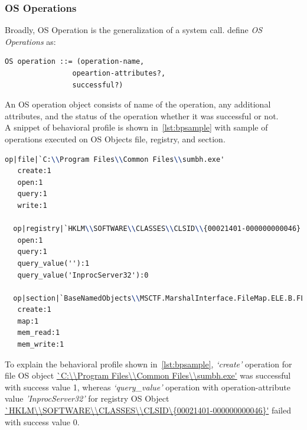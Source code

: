 \subsubsection{OS Operations}
\label{ssub:OS Operations}
Broadly, OS Operation is the generalization of a system call.
\citeauthor{bayer} define \emph{OS Operations} as:
\begin{lstlisting}[numbers=none]
OS operation ::= (operation-name,
                opeartion-attributes?,
                successful?)
\end{lstlisting}
An OS operation object consists of name of the operation, any additional attributes, and the status of the operation whether it was successful or not.\\
A snippet of behavioral profile is shown in~\autoref{lst:bpsample} with sample of operations executed on OS Objects file, registry, and section.
\begin{lstlisting}[numbers=none,language=TeX,caption={Behvaioral Profile sample}, label={lst:bpsample}]
  op|file|`C:\\Program Files\\Common Files\\sumbh.exe'
   create:1
   open:1
   query:1
   write:1

  op|registry|`HKLM\\SOFTWARE\\CLASSES\\CLSID\\{00021401-000000000046}'
   open:1
   query:1
   query_value(''):1
   query_value('InprocServer32'):0

  op|section|`BaseNamedObjects\\MSCTF.MarshalInterface.FileMap.ELE.B.FLKMG'
   create:1
   map:1
   mem_read:1
   mem_write:1
\end{lstlisting}
To explain the behavioral profile shown in~\autoref{lst:bpsample}, \textit{`create'} operation for file OS object \url{`C:\\Program Files\\Common Files\\sumbh.exe'} was successful with success value 1, whereas \textit{`query\_value'} operation with operation-attribute value \emph{'InprocServer32'} for registry OS Object \url{`HKLM\\SOFTWARE\\CLASSES\\CLSID\\{00021401-000000000046}'} failed with success value 0. %
\\

